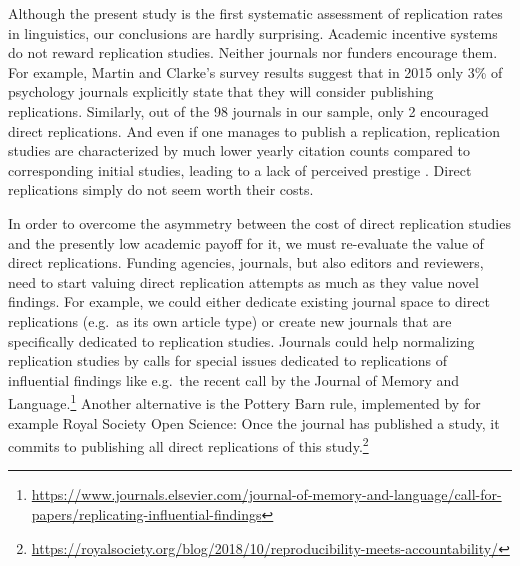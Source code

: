 \documentclass[cm,linguex]{glossa}
\begin{document}
Although the present study is the first systematic assessment of replication rates in linguistics, our conclusions are hardly surprising. Academic incentive systems do not reward replication studies. Neither journals nor funders encourage them. For example, Martin and Clarke's \citeyearpar{martin_are_2017} survey results suggest that in 2015 only 3\% of psychology journals explicitly state that they will consider publishing replications. Similarly, out of the 98 journals in our sample, only 2 encouraged direct replications. And even if one manages to publish a replication, replication studies are characterized by much lower yearly citation counts compared to corresponding initial studies, leading to a lack of perceived prestige \citep[e.g.,][]{koole_rewarding_2012, nosek_scientific_2012, marsden_replication_2018}. Direct replications simply do not seem worth their costs.

In order to overcome the asymmetry between the cost of direct replication studies and the presently low academic payoff for it, we must re-evaluate the value of direct replications. Funding agencies, journals, but also editors and reviewers, need to start valuing direct replication attempts as much as they value novel findings. For example, we could either dedicate existing journal space to direct replications (e.g.~as its own article type) or create new journals that are specifically dedicated to replication studies.
Journals could help normalizing replication studies by calls for special issues dedicated to replications of influential findings like e.g.~the recent call by the Journal of Memory and Language.\footnote{\url{https://www.journals.elsevier.com/journal-of-memory-and-language/call-for-papers/replicating-influential-findings}}
Another alternative is the Pottery Barn rule, implemented by for example Royal Society Open Science: Once the journal has published a study, it commits to publishing all direct replications of this study.\footnote{ \url{https://royalsociety.org/blog/2018/10/reproducibility-meets-accountability/}}
\end{document}

